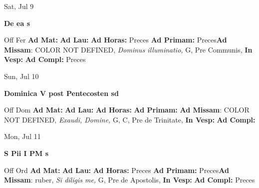 \documentclass[10pt]{book}
\begin{document}
\begin{center}
\begin{minipage}{3.5in}
\vspace{2em}
\begin{center}Sat, Jul 9
\end{center}
\textbf{ \large De ea
\textnormal{\normalsize s}}

\begin{justify}Off Fer
\textbf{Ad Mat: }
\textbf{Ad Lau: }
\textbf{Ad Horas: }Preces
\textbf{Ad Primam: }Preces\textbf{Ad Missam}: COLOR NOT DEFINED, \textit{Dominus illuminatio,} G, Pre Communis, 
\textbf{In Vesp: }
\textbf{Ad Compl: }Preces
\end{justify}
\end{minipage}
\end{center}

\begin{center}
\begin{minipage}{3.5in}
\vspace{2em}
\begin{center}Sun, Jul 10
\end{center}
\textbf{ \large Dominica V post Pentecosten
\textnormal{\normalsize sd}}

\begin{justify}Off Dom
\textbf{Ad Mat: }
\textbf{Ad Lau: }
\textbf{Ad Horas: }
\textbf{Ad Primam: }\textbf{Ad Missam}: COLOR NOT DEFINED, \textit{Exaudi, Domine,} G, C, Pre de Trinitate, 
\textbf{In Vesp: }
\textbf{Ad Compl: }
\end{justify}
\end{minipage}
\end{center}

\begin{center}
\begin{minipage}{3.5in}
\vspace{2em}
\begin{center}Mon, Jul 11
\end{center}
\textbf{ \large S Pii I PM
\textnormal{\normalsize s}}

\begin{justify}Off Ord
\textbf{Ad Mat: }
\textbf{Ad Lau: }
\textbf{Ad Horas: }Preces
\textbf{Ad Primam: }Preces\textbf{Ad Missam}: ruber, \textit{Si diligis me,} G, Pre de Apostolis, 
\textbf{In Vesp: }
\textbf{Ad Compl: }Preces
\end{justify}
\end{minipage}
\end{center}
\end{document}
